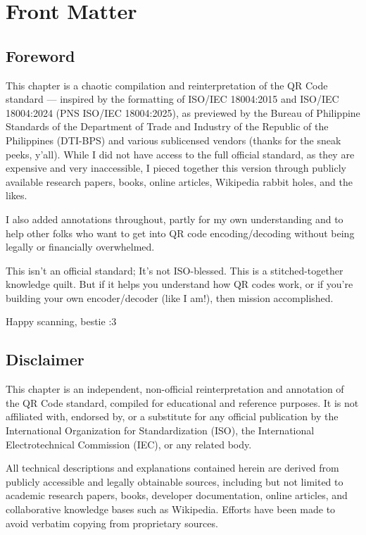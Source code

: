 \section{Front Matter}

\subsection{Foreword}

This chapter is a chaotic compilation and reinterpretation of the QR Code standard — inspired by the formatting of ISO/IEC 18004:2015 and ISO/IEC 18004:2024 (PNS ISO/IEC 18004:2025), as previewed by the Bureau of Philippine Standards of the Department of Trade and Industry of the Republic of the Philippines (DTI-BPS) and various sublicensed vendors (thanks for the sneak peeks, y’all).  While I did not have access to the full official standard, as they are expensive and very inaccessible, I pieced together this version through publicly available research papers, books, online articles, Wikipedia rabbit holes, and the likes.

I also added annotations throughout, partly for my own understanding and to help other folks who want to get into QR code encoding/decoding without being legally or financially overwhelmed.

This isn’t an official standard; It’s not ISO-blessed. This is a stitched-together knowledge quilt. But if it helps you understand how QR codes work, or if you’re building your own encoder/decoder (like I am!), then mission accomplished.

Happy scanning, bestie :3

\subsection{Disclaimer}

This chapter is an independent, non-official reinterpretation and annotation of the QR Code standard, compiled for educational and reference purposes. It is not affiliated with, endorsed by, or a substitute for any official publication by the International Organization for Standardization (ISO), the International Electrotechnical Commission (IEC), or any related body.

All technical descriptions and explanations contained herein are derived from publicly accessible and legally obtainable sources, including but not limited to academic research papers, books, developer documentation, online articles, and collaborative knowledge bases such as Wikipedia. Efforts have been made to avoid verbatim copying from proprietary sources.

